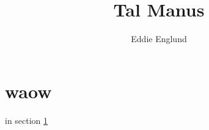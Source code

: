 \documentclass[12pt]{article}
\title{Tal Manus}
\author{Eddie Englund}
\begin{document}
    
\maketitle

\section{waow}\label{owo}

in section \ref{owo}
\end{document}
